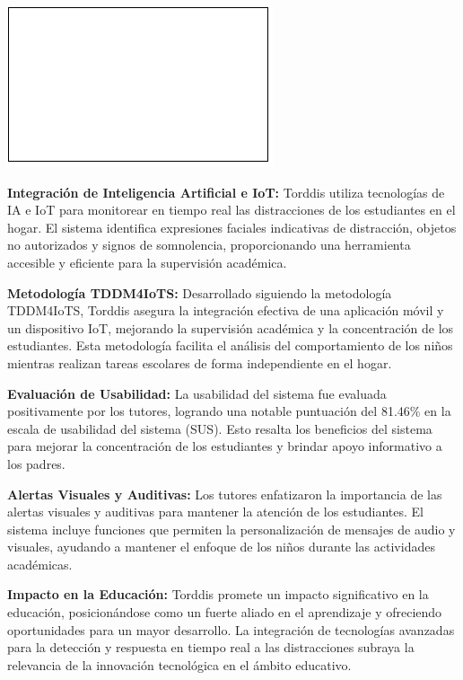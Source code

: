 \documentclass[a4paper,fleqn]{cas-sc}
\begin{document}
	\begin{graphicalabstract}
		\includegraphics{figs/cas-grabs.pdf}
	\end{graphicalabstract}
	
	\begin{highlights}
		\item \textbf{Integración de Inteligencia Artificial e IoT:} Torddis utiliza tecnologías de IA e IoT para monitorear en tiempo real las distracciones de los estudiantes en el hogar. El sistema identifica expresiones faciales indicativas de distracción, objetos no autorizados y signos de somnolencia, proporcionando una herramienta accesible y eficiente para la supervisión académica.
		\item \textbf{Metodología TDDM4IoTS:} Desarrollado siguiendo la metodología TDDM4IoTS, Torddis asegura la integración efectiva de una aplicación móvil y un dispositivo IoT, mejorando la supervisión académica y la concentración de los estudiantes. Esta metodología facilita el análisis del comportamiento de los niños mientras realizan tareas escolares de forma independiente en el hogar.
		\item \textbf{Evaluación de Usabilidad:} La usabilidad del sistema fue evaluada positivamente por los tutores, logrando una notable puntuación del 81.46\% en la escala de usabilidad del sistema (SUS). Esto resalta los beneficios del sistema para mejorar la concentración de los estudiantes y brindar apoyo informativo a los padres.
		\item \textbf{Alertas Visuales y Auditivas:} Los tutores enfatizaron la importancia de las alertas visuales y auditivas para mantener la atención de los estudiantes. El sistema incluye funciones que permiten la personalización de mensajes de audio y visuales, ayudando a mantener el enfoque de los niños durante las actividades académicas.
		\item \textbf{Impacto en la Educación:} Torddis promete un impacto significativo en la educación, posicionándose como un fuerte aliado en el aprendizaje y ofreciendo oportunidades para un mayor desarrollo. La integración de tecnologías avanzadas para la detección y respuesta en tiempo real a las distracciones subraya la relevancia de la innovación tecnológica en el ámbito educativo.
	\end{highlights}
	
\end{document}
